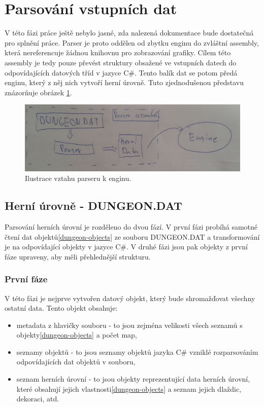 \section{Parsování vstupních dat}

V této fázi práce ještě nebylo jasné, zda nalezená dokumentace\cite{TechnicalDocumentationFontanel05} bude dostatečná
pro splnění práce. Parser je proto oddělen od zbytku enginu do zvláštní assembly, která nereferencuje žádnou knihovnu
pro zobrazování grafiky. Cílem této assembly je tedy pouze převést struktury obsažené ve vstupních datech do odpovídajících
datových tříd v jazyce C\#. Tento balík dat se potom předá enginu, který z něj nich vytvoří herní úrovně. Tuto zjednodušenou
představu znázorňuje obrázek \ref{parser-preview:analyza}.

\begin{figure}[h]\centering
\includegraphics[width=\textwidth]{./img/DM-parser-preview.png}
\caption{Ilustrace vztahu parseru k enginu.}
\label{parser-preview:analyza}
\end{figure}

\subsection{Herní úrovně - DUNGEON.DAT}\label{dungeon-parser}

Parsování herních úrovní je rozděleno do dvou fází. V první fázi probíhá samotné čtení dat objektů\vref{dungeon-objects} ze souboru DUNGEON.DAT
a transformování je na odpovídající objekty v jazyce C\#. V druhé fázi jsou pak objekty z první fáze upraveny,
aby měli přehlednější strukturu. 


\subsubsection{První fáze}

V této fázi je nejprve vytvořen datový objekt, který bude shromažďovat všechny ostatní data. Tento objekt obsahuje:

\begin{itemize}
\item metadata z hlavičky souboru - to jsou zejména velikosti všech seznamů s objekty\vref{dungeon-objects} a počet map,
\item seznamy objektů - to jsou seznamy objektů jazyka C\# vzniklé rozparsováním odpovídajících dat objektů v souboru,
\item seznam herních úrovní - to jsou objekty reprezentující data herních úrovní, které obsahují jejich vlastnosti\vref{dungeon-objects} a seznam jejich dlaždic, dekoraci, atd. 
\end{itemize}

